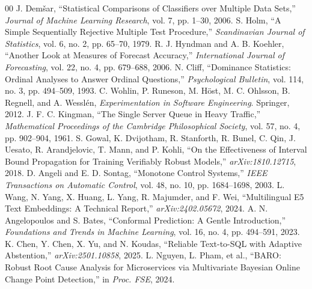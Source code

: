 \documentclass[journal, 10pt]{IEEEtran}
\begin{document}
\begin{thebibliography}{00}
J. Demšar, ``Statistical Comparisons of Classifiers over Multiple Data Sets,'' \emph{Journal of Machine Learning Research}, vol. 7, pp. 1--30, 2006.
S. Holm, ``A Simple Sequentially Rejective Multiple Test Procedure,'' \emph{Scandinavian Journal of Statistics}, vol. 6, no. 2, pp. 65--70, 1979.
R. J. Hyndman and A. B. Koehler, ``Another Look at Measures of Forecast Accuracy,'' \emph{International Journal of Forecasting}, vol. 22, no. 4, pp. 679--688, 2006.
N. Cliff, ``Dominance Statistics: Ordinal Analyses to Answer Ordinal Questions,'' \emph{Psychological Bulletin}, vol. 114, no. 3, pp. 494--509, 1993.
C. Wohlin, P. Runeson, M. Höst, M. C. Ohlsson, B. Regnell, and A. Wesslén, \emph{Experimentation in Software Engineering}. Springer, 2012.
J. F. C. Kingman, ``The Single Server Queue in Heavy Traffic,'' \emph{Mathematical Proceedings of the Cambridge Philosophical Society}, vol. 57, no. 4, pp. 902--904, 1961.
S. Gowal, K. Dvijotham, R. Stanforth, R. Bunel, C. Qin, J. Uesato, R. Arandjelovic, T. Mann, and P. Kohli, ``On the Effectiveness of Interval Bound Propagation for Training Verifiably Robust Models,'' \emph{arXiv:1810.12715}, 2018.
D. Angeli and E. D. Sontag, ``Monotone Control Systems,'' \emph{IEEE Transactions on Automatic Control}, vol. 48, no. 10, pp. 1684--1698, 2003.
L. Wang, N. Yang, X. Huang, L. Yang, R. Majumder, and F. Wei, ``Multilingual E5 Text Embeddings: A Technical Report,'' \emph{arXiv:2402.05672}, 2024.
A. N. Angelopoulos and S. Bates, ``Conformal Prediction: A Gentle Introduction,'' \emph{Foundations and Trends in Machine Learning}, vol. 16, no. 4, pp. 494--591, 2023.
K. Chen, Y. Chen, X. Yu, and N. Koudas, ``Reliable Text-to-SQL with Adaptive Abstention,'' \emph{arXiv:2501.10858}, 2025.
L. Nguyen, L. Pham, et al., ``BARO: Robust Root Cause Analysis for Microservices via Multivariate Bayesian Online Change Point Detection,'' in \emph{Proc. FSE}, 2024.
\end{thebibliography}
\end{document}

